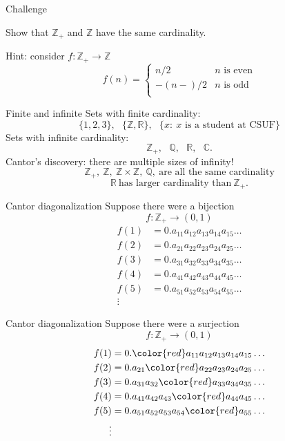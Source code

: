 \documentclass{beamer}
\begin{document}
\begin{frame}{Challenge}
\begin{prob}
Show that $\mathbb{Z}_+$ and $\mathbb{Z}$ have the same cardinality.
\end{prob}
\pause
Hint: consider $f: \mathbb{Z}_+\rightarrow\mathbb{Z}$
$$f(n) = \left\lbrace\begin{array}{cc}
n/2 & \text{$n$ is even}\\
-(n-)/2 & \text{$n$ is odd}\\
\end{array}\right.$$
\end{frame}

\begin{frame}{Finite and infinite}
\pause
Sets with finite cardinality:
$$\{1,2,3\},\ \ \ \{\mathbb{Z},\mathbb{R}\},\ \ \ \{x:\ \text{$x$ is a student at CSUF}\}$$
\pause
Sets with infinite cardinality:
$$\mathbb{Z}_+,\ \ \ \mathbb{Q},\ \ \ \mathbb{R},\ \ \ \mathbb{C}.$$
\pause
Cantor's discovery: there are multiple sizes of infinity!
$$\mathbb{Z}_+,\ \mathbb{Z},\ \mathbb{Z}\times\mathbb{Z},\ \mathbb{Q},\ \text{are all the same cardinality}$$
\pause
$$\mathbb{R}\  \text{has larger cardinality than}\ \mathbb{Z}_+.$$
\end{frame}


\begin{frame}{Cantor diagonalization}
Suppose there were a bijection
$$f: \mathbb{Z}_+\rightarrow (0,1)$$
\pause
\begin{align*}
f(1) &= 0.a_{11}a_{12}a_{13}a_{14}a_{15}\dots\\
f(2) &= 0.a_{21}a_{22}a_{23}a_{24}a_{25}\dots\\
f(3) &= 0.a_{31}a_{32}a_{33}a_{34}a_{35}\dots\\
f(4) &= 0.a_{41}a_{42}a_{43}a_{44}a_{45}\dots\\
f(5) &= 0.a_{51}a_{52}a_{53}a_{54}a_{55}\dots\\
\vdots 
\end{align*}
\end{frame}

\begin{frame}{Cantor diagonalization}
Suppose there were a surjection
$$f: \mathbb{Z}_+\rightarrow (0,1)$$
\pause
\begin{align*}
f(1) &= 0.{\color{red} a_{11}}a_{12}a_{13}a_{14}a_{15}\dots\\
f(2) &= 0.a_{21}{\color{red} a_{22}}a_{23}a_{24}a_{25}\dots\\
f(3) &= 0.a_{31}a_{32}{\color{red} a_{33}}a_{34}a_{35}\dots\\
f(4) &= 0.a_{41}a_{42}a_{43}{\color{red} a_{44}}a_{45}\dots\\
f(5) &= 0.a_{51}a_{52}a_{53}a_{54}{\color{red} a_{55}}\dots\\
\vdots 
\end{align*}
\end{frame}
\end{document}
